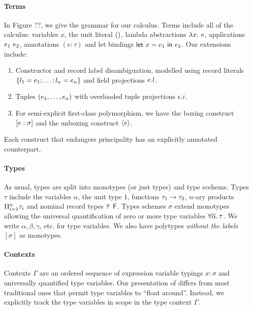 \documentclass[acmsmall,screen,nonacm]{acmart}
\begin{document}
\paragraph{Terms}

In Figure ??, we give the grammar for our calculus. Terms include all of the \ML calculus: 
variables $x$, the unit literal $()$, lambda abstractions $\lambda {x}. ~ {e}$, applications ${e_1} ~ {e_2}$, annotations $(e : \tau)$ and let
bindings $\mathsf{let} ~ x = e_1 ~ \mathsf{in} ~ e_2$. Our extensions include:
\begin{enumerate}
  \item Constructor and record label disambiguation, modelled using record literals $\{  l_1 = e_1; \ldots; l_n = e_n  \}$
  and field projections $e.l$. 

  \item Tuples $(e_1, \ldots, e_n)$ with overloaded tuple projections $e.i$. 

  \item For semi-explicit first-class polymorphism, we have the boxing construct $[ e : \sigma ]$ and the unboxing construct $\langle e \rangle$.
\end{enumerate}
Each construct that endangers principality has an explicitly annotated counterpart. 

\paragraph{Types} As usual, types are split into monotypes (or just types) and type scehems. Types $\tau$ include the variables $\alpha$, the unit type $1$, functions $\tau_1 \to \tau_2$, $n$-ary products $\Pi_{i = 1}^n \tau_i$ and 
nominal record types $\overline{\tau} \mathop{}\mathrel{\mathsf{F}}$. Types schemes $\sigma$ extend monotypes allowing the universal quantification of zero or more type 
variables $\forall {\overline{\alpha}}.\,{\tau}$. We write $\alpha, \beta, \gamma$, etc. for type variables. We also have polytypes 
\textit{without the labels} $[\sigma]$ as monotypes. 

\paragraph{Contexts} Contexts $\Gamma$ are an ordered sequence of expression variable typings $x : \sigma$ and 
universally quantified type variables. Our presentation of \ML differs from most traditional ones that permit type variables 
to ``float around''. Instead, we explicitly track the type variables in scope in the type context $\Gamma$. 
\end{document}
